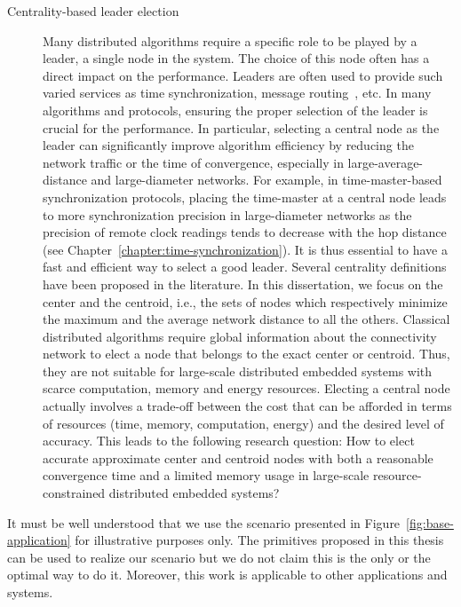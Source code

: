 \begin{description}
	\item [Centrality-based leader election] Many distributed algorithms require a specific role to be played by a leader, a single node in the system. The choice of this node often has a direct impact on the performance. Leaders are often used to provide such varied services as time synchronization, message routing~\cite{blazevic2005location}, etc. In many algorithms and protocols, ensuring the proper selection of the leader is crucial for the performance. In particular, selecting a central node as the leader can significantly improve algorithm efficiency by reducing the network traffic or the time of convergence, especially in large-average-distance and large-diameter networks. For example, in time-master-based synchronization protocols, placing the time-master at a central node leads to more synchronization precision in large-diameter networks as the precision of remote clock readings tends to decrease with the hop distance (see Chapter~\ref{chapter:time-synchronization}). It is thus essential to have a fast and efficient way to select a good leader. Several centrality definitions have been proposed in the literature. In this dissertation, we focus on the center and the centroid, i.e., the sets of nodes which respectively minimize the maximum and the average network distance to all the others. Classical distributed algorithms require global information about the connectivity network to elect a node that belongs to the exact center or centroid. Thus, they are not suitable for large-scale distributed embedded systems with scarce computation, memory and energy resources. Electing a central node actually involves a trade-off between the cost that can be afforded in terms of resources (time, memory, computation, energy) and the desired level of accuracy. This leads to the following research question: How to elect accurate approximate center and centroid nodes with both a reasonable convergence time and a limited memory usage in large-scale resource-constrained distributed embedded systems? 
\end{description}

It must be well understood that we use the scenario presented in Figure~\ref{fig:base-application} for illustrative purposes only. The primitives proposed in this thesis can be used to realize our scenario but we do not claim this is the only or the optimal way to do it. Moreover, this work is applicable to other applications and systems.

